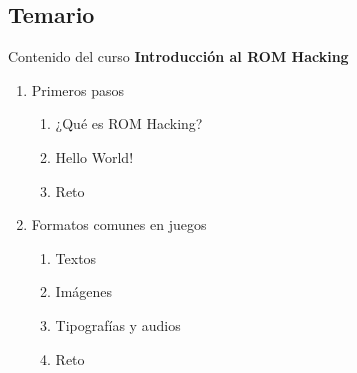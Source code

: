 \subsection{Temario}
\begin{frame}[t]{Contenido del curso}
    \centering
    {\Large \textbf{Introducción al ROM Hacking}}
    \vfill
    \setlength{\leftmargini}{8em}
    \begin{enumerate}
        \addtolength{\itemsep}{10pt}
        \item<+-> Primeros pasos
        \begin{enumerate}
            \item ¿Qué es ROM Hacking?
            \item Hello World!
            \item Reto
        \end{enumerate}
        \item<+-> Formatos comunes en juegos
        \begin{enumerate}
            \item Textos
            \item Imágenes
            \item Tipografías y audios
            \item Reto
        \end{enumerate}
    \end{enumerate}
\end{frame}
